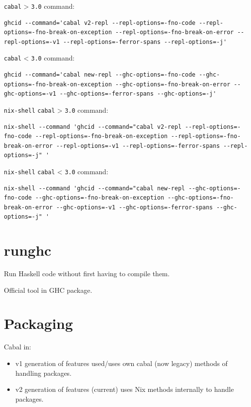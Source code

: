 \documentclass[a4paper,14pt,oneside]{book}
\begin{document}
\texttt{cabal} > \texttt{3.0} command:
\begin{verbatim}
ghcid --command='cabal v2-repl --repl-options=-fno-code --repl-options=-fno-break-on-exception --repl-options=-fno-break-on-error --repl-options=-v1 --repl-options=-ferror-spans --repl-options=-j'
\end{verbatim}

\texttt{cabal} < \texttt{3.0} command:
\begin{verbatim}
ghcid --command='cabal new-repl --ghc-options=-fno-code --ghc-options=-fno-break-on-exception --ghc-options=-fno-break-on-error --ghc-options=-v1 --ghc-options=-ferror-spans --ghc-options=-j'
\end{verbatim}

\texttt{nix-shell} \texttt{cabal} > \texttt{3.0} command:
\begin{verbatim}
nix-shell --command 'ghcid --command="cabal v2-repl --repl-options=-fno-code --repl-options=-fno-break-on-exception --repl-options=-fno-break-on-error --repl-options=-v1 --repl-options=-ferror-spans --repl-options=-j" '
\end{verbatim}

\texttt{nix-shell} \texttt{cabal} < \texttt{3.0} command:
\begin{verbatim}
nix-shell --command 'ghcid --command="cabal new-repl --ghc-options=-fno-code --ghc-options=-fno-break-on-exception --ghc-options=-fno-break-on-error --ghc-options=-v1 --ghc-options=-ferror-spans --ghc-options=-j" '

\end{verbatim}

\chapter{runghc}
\label{sec:orgd33e529}

Run Haskell code without first having to compile them.

Official tool in GHC package.

\chapter{Packaging}
\label{sec:org0fe5289}

Cabal in:
\begin{itemize}
\item v1 generation of features used/uses own cabal (now legacy) methods of handling packages.
\item v2 generation of features (current) uses Nix methods internally to handle packages.
\end{itemize}
\end{document}

